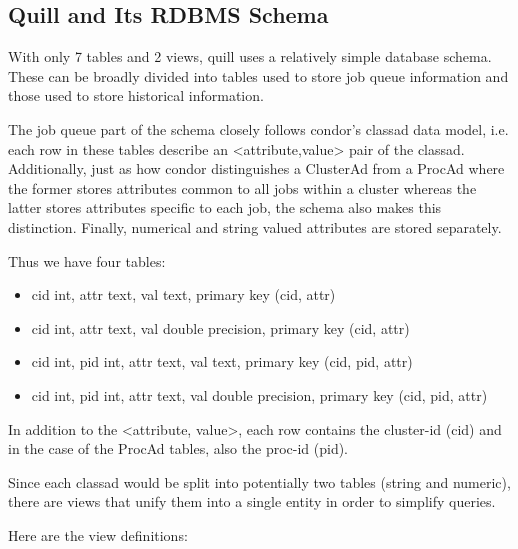 \subsection{\label{sec:Quill-Schema}Quill and Its RDBMS Schema}

With only 7 tables and 2 views, quill uses a relatively simple database
schema.  These can be broadly divided into tables used to store job
queue information and those used to store historical information.

The job queue part of the schema closely follows condor's classad data
model, i.e. each row in these tables describe an <attribute,value>
pair of the classad.  Additionally, just as how condor distinguishes a
ClusterAd from a ProcAd where the former stores attributes common to all
jobs within a cluster whereas the latter stores attributes specific to
each job, the schema also makes this distinction.  Finally, numerical
and string valued attributes are stored separately.

Thus we have four tables:

\begin{itemize}

\item 
		{cid int, 
		attr text, 
		val text, 
		primary key (cid, attr)}

\item 
		{cid int, 
		attr text, 
		val double precision, 
		primary key (cid, attr)}

\item 
		{cid int, 
		pid int, 
		attr text, 
		val text, 
		primary key (cid, pid, attr)}

\item 
		{cid int, 
		pid int, 
		attr text, 
		val double precision,
		primary key (cid, pid, attr)}

\end{itemize}

In addition to the <attribute, value>, each row contains the cluster-id
(cid) and in the case of the ProcAd tables, also the proc-id (pid).

Since each classad would be split into potentially two tables (string
and numeric), there are views that unify them into a single entity in
order to simplify queries.

Here are the view definitions:

